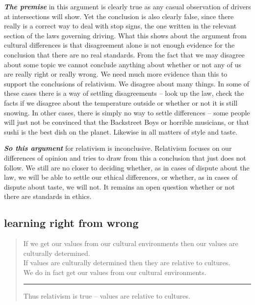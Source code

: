 \documentclass[]{book}
\newenvironment{argument}{\begin{quote}\normalsize}{\end{quote}}
\begin{document}
\textbf{\emph{The premise}} in this argument is clearly true as any casual observation of drivers at intersections will show. Yet the conclusion is also clearly false, since there really is a correct way to deal with stop signs, the one written in the relevant section of the laws governing driving. What this shows about the argument from cultural differences is that disagreement alone is not enough evidence for the conclusion that there are no real standards. From the fact that we may disagree about some topic we cannot conclude anything about whether or not any of us are really right or really wrong. We need much more evidence than this to support the conclusions of relativism. We disagree about many things. In some of these cases there is a way of settling disagreements -- look up the law, check the facts if we disagree about the temperature outside or whether or not it is still snowing. In other cases, there is simply no way to settle differences -- some people will just not be convinced that the Backstreet Boys or horrible musicians, or that sushi is the best dish on the planet. Likewise in all matters of style and taste.

\textbf{\emph{So this argument}} for relativism is inconclusive. Relativism focuses on our differences of opinion and tries to draw from this a conclusion that just does not follow. We still are no closer to deciding whether, as in cases of dispute about the law, we will be able to settle our ethical differences, or whether, as in cases of dispute about taste, we will not. It remains an open question whether or not there are standards in ethics.

\hypertarget{learning-right-from-wrong}{%
\subsection*{learning right from wrong}\label{learning-right-from-wrong}}


\begin{argument}
If we get our values from our cultural environments then our values are
culturally determined.\\

If values are culturally determined then they are relative to
cultures.\\

We do in fact get our values from our cultural environments.

\begin{center}\rule{0.5\linewidth}{\linethickness}\end{center}

Thus relativism is true -- values are relative to cultures.
\end{argument}
\end{document}
